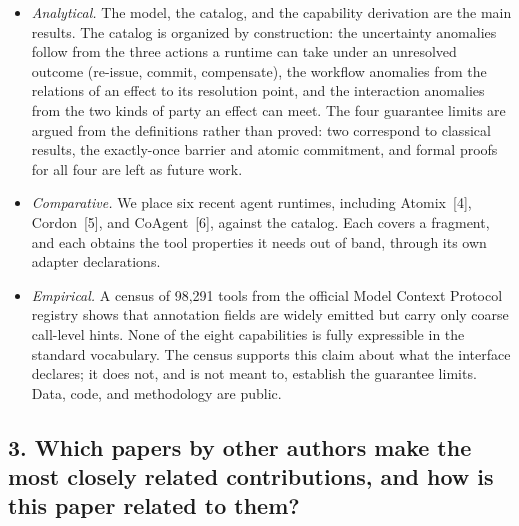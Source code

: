 \documentclass[11pt,a4paper]{article}
\begin{document}
\begin{itemize}
\item \emph{Analytical.} The model, the catalog, and the capability
derivation are the main results. The catalog is organized by
construction: the uncertainty anomalies follow from the three actions a
runtime can take under an unresolved outcome (re-issue, commit,
compensate), the workflow anomalies from the relations of an effect to its
resolution point, and the interaction anomalies from the two kinds of
party an effect can meet. The four guarantee limits are argued from the
definitions rather than proved: two correspond to classical results, the
exactly-once barrier and atomic commitment, and formal proofs for all
four are left as future work.
\item \emph{Comparative.} We place six recent agent runtimes, including
Atomix~[4], Cordon~[5], and CoAgent~[6], against the catalog. Each covers a
fragment, and each obtains the tool properties it needs out of band,
through its own adapter declarations.
\item \emph{Empirical.} A census of 98,291 tools from the official Model
Context Protocol registry shows that annotation fields are widely emitted
but carry only coarse call-level hints. None of the eight capabilities is
fully expressible in the standard vocabulary. The census supports this
claim about what the interface declares; it does not, and is not meant
to, establish the guarantee limits. Data, code, and methodology are
public.
\end{itemize}

\subsection*{3. Which papers by other authors make the most closely related
contributions, and how is this paper related to them?}
\end{document}
